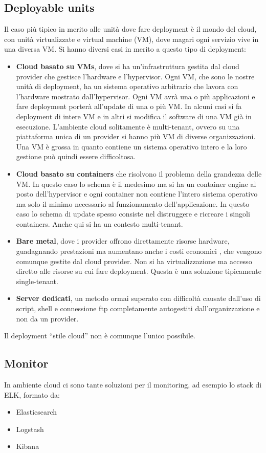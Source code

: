 \subsection{Deployable units}
Il caso più tipico in merito alle unità dove fare deployment è il mondo del cloud, con unità virtualizzate e virtual machine (VM), dove magari ogni servizio vive in una diversa VM. Si hanno diversi casi in merito a questo tipo di deployment:
\begin{itemize}
    \item \textbf{Cloud basato su VMs}, dove si ha un’infrastruttura gestita dal cloud provider che gestisce l’hardware e l’hypervisor. Ogni VM, che sono le nostre unità di deployment, ha un sistema operativo arbitrario che lavora con l’hardware mostrato dall’hypervisor. Ogni VM avrà una o più applicazioni e fare deployment porterà all’update di una o più VM. In alcuni casi si fa deployment di intere VM e in altri si modifica il software di una VM già in esecuzione. L’ambiente cloud solitamente è multi-tenant, ovvero su una piattaforma unica di un provider si hanno più VM di diverse organizzazioni. Una VM è grossa in quanto contiene un sistema operativo intero e la loro gestione può quindi essere difficoltosa.
    \item \textbf{Cloud basato su containers} che risolvono il problema della grandezza delle VM. In questo caso lo schema è il medesimo ma si ha un container engine al posto dell’hypervisor e ogni container non contiene l’intero sistema operativo ma solo il minimo necessario al funzionamento dell’applicazione. In questo caso lo schema di update spesso consiste nel distruggere e ricreare i singoli containers. Anche qui si ha un contesto multi-tenant.
    \item \textbf{Bare metal}, dove i provider offrono direttamente risorse hardware, guadagnando prestazioni ma aumentano anche i costi economici , che vengono comunque gestite dal cloud provider. Non si ha virtualizzazione ma accesso diretto alle risorse su cui fare deployment. Questa è una soluzione tipicamente single-tenant.
    \item \textbf{Server dedicati}, un metodo ormai superato con difficoltà causate dall’uso di script, shell e connessione ftp completamente autogestiti dall’organizzazione e non da un provider.
\end{itemize}

Il deployment “stile cloud” non è comunque l’unico possibile. 
\subsection{Monitor}
In ambiente cloud ci sono tante soluzioni per il monitoring, ad esempio lo stack di ELK, formato da:
\begin{itemize}
    \item Elasticsearch
    \item Logstash
    \item Kibana
\end{itemize}

